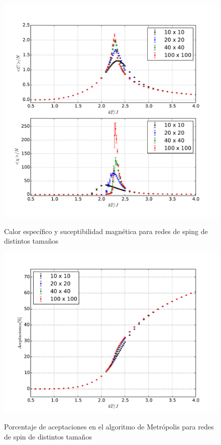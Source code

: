 \documentclass[a4paper,12pt]{article}
\begin{document}
\begin{figure}[H]
    \begin{center}
      \includegraphics[scale=0.7]{tamano_fluctuaciones.pdf} \\
      \caption{Calor específico y suceptibilidad magnética para redes de sping 
      de distintos tamaños}\label{fig:tam_fluctuaciones}
    \end{center}
\end{figure}

\begin{figure}[H]
    \begin{center}
      \includegraphics[scale=0.5]{tamano_aceptaciones.pdf} \\
      \caption{Porcentaje de aceptaciones en el algoritmo de Metrópolis para 
      redes de spin de distintos tamaños}\label{fig:tam_aceptaciones}
    \end{center}
\end{figure}
\end{document}
